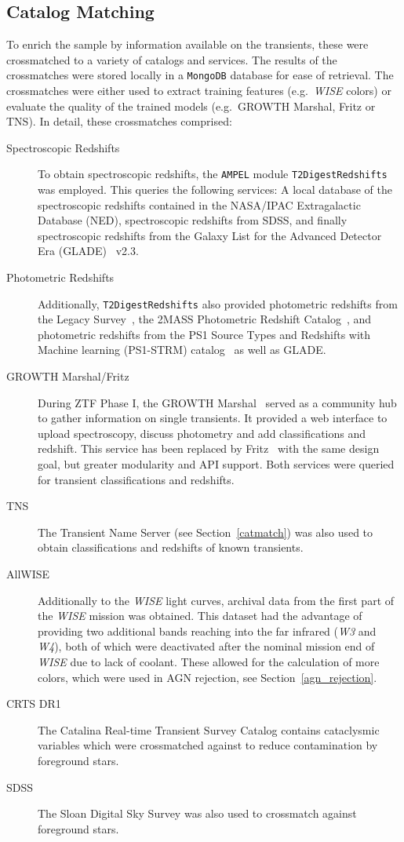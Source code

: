 \subsection{Catalog Matching}
To enrich the sample by information available on the transients, these were crossmatched to a variety of catalogs and services. The results of the crossmatches were stored locally in a \texttt{MongoDB} database for ease of retrieval. The crossmatches were either used to extract training features (e.g.~\textit{WISE} colors) or evaluate the quality of the trained models (e.g.~GROWTH Marshal, Fritz or TNS). In detail, these crossmatches comprised:

\begin{description}
  \item[Spectroscopic Redshifts] To obtain spectroscopic redshifts, the \texttt{AMPEL} module \texttt{T2DigestRedshifts} was employed. This queries the following services: A local database of the spectroscopic redshifts contained in the NASA/IPAC Extragalactic Database (NED), spectroscopic redshifts from SDSS, and finally spectroscopic redshifts from the Galaxy List for the Advanced Detector Era (GLADE)~ v2.3.
  \item[Photometric Redshifts] Additionally, \texttt{T2DigestRedshifts} also provided photometric redshifts from the Legacy Survey~, the 2MASS Photometric Redshift Catalog~, and photometric redshifts from the PS1 Source Types and Redshifts with Machine learning (PS1-STRM) catalog~ as well as GLADE.
  \item[GROWTH Marshal/Fritz] During ZTF Phase I, the GROWTH Marshal~ served as a community hub to gather information on single transients. It provided a web interface to upload spectroscopy, discuss photometry and add classifications and redshift. This service has been replaced by Fritz~ with the same design goal, but greater modularity and API support. Both services were queried for transient classifications and redshifts.
  \item[TNS] The Transient Name Server (see Section~\ref{catmatch}) was also used to obtain classifications and redshifts of known transients.
  \item[AllWISE] Additionally to the \textit{WISE} light curves, archival data from the first part of the \textit{WISE} mission was obtained. This dataset had the advantage of providing two additional bands reaching into the far infrared (\textit{W3} and \textit{W4}), both of which were deactivated after the nominal mission end of \textit{WISE} due to lack of coolant. These allowed for the calculation of more colors, which were used in AGN rejection, see Section~\ref{agn_rejection}.
  \item[CRTS DR1] The Catalina Real-time Transient Survey Catalog contains cataclysmic variables which were crossmatched against to reduce contamination by foreground stars.
  \item[SDSS] The Sloan Digital Sky Survey was also used to crossmatch against foreground stars.
\end{description}

